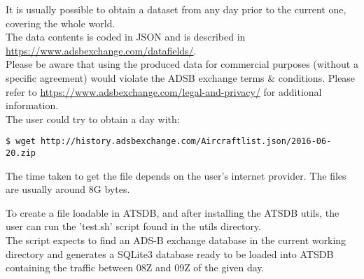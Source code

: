 It is usually possible to obtain a dataset from any day prior to the current one, covering the whole world. \\

The data contents is coded in JSON and is described in \url{https://www.adsbexchange.com/datafields/}. \\

Please be aware that using the produced data for commercial purposes (without a specific agreement) would violate the ADSB exchange terms \& conditions. Please refer to \url{https://www.adsbexchange.com/legal-and-privacy/} for additional information.\\

The user could try to obtain a day with:
\begin{verbatim}
$ wget http://history.adsbexchange.com/Aircraftlist.json/2016-06-20.zip
\end{verbatim}

The time taken to get the file depends on the user's internet provider. The files are usually around 8G bytes.

To create a file loadable in ATSDB, and after installing the ATSDB utils, the user can run the 'test.sh' script found in the utils directory. \\

The script expects to find an ADS-B exchange database in the current working directory and generates a SQLite3 database ready to be loaded into ATSDB containing the traffic between 08Z and 09Z of the given day.
